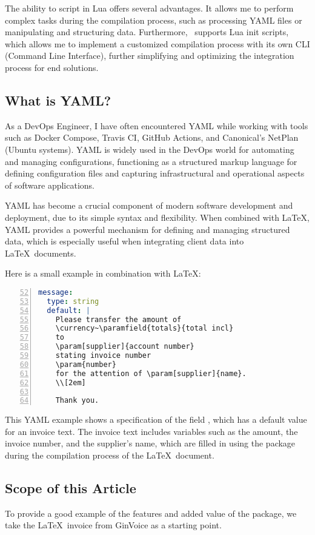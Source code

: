 The ability to script in Lua offers several advantages.
It allows me to perform complex tasks during the compilation process, such as processing YAML files or manipulating and structuring data.
Furthermore, \LuaLaTeX\ supports Lua init scripts, which allows me to implement a customized compilation process with its own CLI (Command Line Interface), further simplifying and optimizing the integration process for end solutions.

\subsection{What is YAML?}
As a DevOps Engineer, I have often encountered YAML while working with tools such as Docker Compose, Travis CI, GitHub Actions, and Canonical's NetPlan (Ubuntu systems).
YAML is widely used in the DevOps world for automating and managing configurations, functioning as a structured markup language for defining configuration files and capturing infrastructural and operational aspects of software applications.

YAML has become a crucial component of modern software development and deployment, due to its simple syntax and flexibility.
When combined with \LaTeX, YAML provides a powerful mechanism for defining and managing structured data, which is especially useful when integrating client data into \LaTeX\ documents.

\noindent
Here is a small example in combination with \LaTeX:

\begin{lstlisting}[language=YAML,numbers=left,xleftmargin=15pt,caption={\ttfamily recipes/invoice.yaml},firstnumber=52]
message:
  type: string
  default: |
    Please transfer the amount of
    \currency~\paramfield{totals}{total incl}
    to
    \param[supplier]{account number}
    stating invoice number
    \param{number}
    for the attention of \param[supplier]{name}.
    \\[2em]

    Thank you.

\end{lstlisting}
This YAML example shows a specification of the field , which has a default value for an invoice text.
The invoice text includes variables such as the amount, the invoice number, and the supplier's name, which are filled in using the  package during the compilation process of the \LaTeX\ document.

\subsection{Scope of this Article}\label{sec:scope}
To provide a good example of the features and added value of the  package, we take the \LaTeX\ invoice from GinVoice as a starting point.

